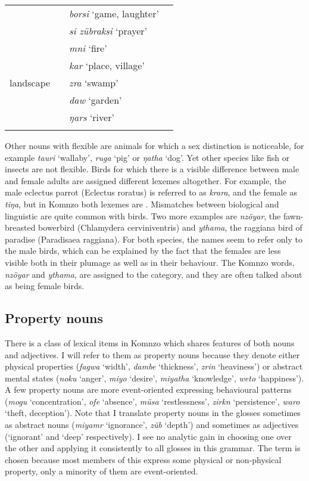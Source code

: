 {\begin{table}
\begin{tabular}	{p{2cm}lp{}p{}}
		&&\emph{borsi} `game, laughter'&\\
		&&\emph{si zübraksi} `prayer'&\\\midrule
		\multirow{5}{1,8cm}{landscape}&\multirow{5}{*}{\F}&\emph{mni} `fire'&\\
		&&\emph{kar} `place, village'&\\
		&&\emph{zra} `swamp'&\\
		&&\emph{daw} `garden'&\\
		&&\emph{ŋars} `river'&\\
		\lspbottomrule
	\end{tabular}
\end{table}}

Other nouns with flexible  are animals for which a sex distinction is noticeable, for example \emph{tauri} `wallaby', \emph{ruga} `pig' or \emph{ŋatha} `dog'. Yet other species like fish or insects are not flexible. Birds for which there is a visible difference between male and female adults are assigned different lexemes altogether. For example, the male eclectus parrot (Eclectus roratus) is referred to as \emph{krara}, and the female as \emph{tiŋa}, but in Komnzo both lexemes are . Mismatches between biological  and linguistic  are quite common with birds. Two more examples are \emph{nzöyar}, the fawn-breasted bowerbird (Chlamydera cerviniventris) and \emph{ythama}, the raggiana bird of paradise (Paradisaea raggiana). For both species, the names seem to refer only to the male birds, which can be explained by the fact that the females are less visible both in their plumage as well as in their behaviour. The Komnzo words, \emph{nzöyar} and \emph{ythama}, are assigned to the  category, and they are often talked about as being female birds.

\subsection{Property nouns} \label{propertynouns}

There is a class of lexical items in Komnzo which shares features of both nouns and adjectives. I will refer to them as property nouns because they denote either physical properties (\emph{fagwa} `width', \emph{dambe} `thickness', \emph{zrin} `heaviness') or abstract mental states (\emph{noku} `anger', \emph{miyo} `desire', \emph{miyatha} `knowledge', \emph{weto} `happiness'). A few property nouns are more event-oriented expressing behavioural patterns (\emph{mogu} `concentration', \emph{ofe} `absence', \emph{müsa} `restlessness', \emph{zirkn} `persistence', \emph{waro} `theft, deception'). Note that I translate property nouns in the glosses sometimes as abstract nouns (\emph{miyamr} `ignorance', \emph{züb} `depth') and sometimes as adjectives (`ignorant' and `deep' respectively). I see no analytic gain in choosing one over the other and applying it consistently to all glosses in this grammar. The term  is chosen because most members of this  express some physical or non-physical property, only a minority of them are event-oriented.%

